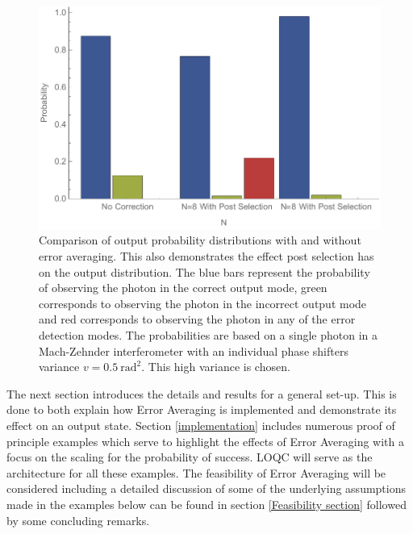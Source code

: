 \documentclass[aps,pra,twocolumn,superscriptaddress,numerical,floatfix]{revtex4-1}
\begin{document}
\begin{figure}
	\begin{centering}
		\includegraphics[width=\columnwidth]{prob_distributions.pdf}
	\end{centering}
	\caption[Comparison of output probability distributions with and without Error Averaging.]{Comparison of output probability distributions with and without error 	averaging. This also demonstrates the effect post selection has on the output distribution. The blue bars represent the probability of observing the photon in the correct output mode, green corresponds to observing the photon in the incorrect output mode and red corresponds to observing the photon in any of the error detection modes. The probabilities are based on a single photon in a Mach-Zehnder interferometer with an individual phase shifters variance $v=0.5\ \textrm{rad}^{2}$. This high variance is chosen.} 
	\label{fig:output_probabilities}
\end{figure}

The next section introduces the details and results for a general set-up. This is done to both explain how Error Averaging is implemented and demonstrate its effect on an output state. Section \ref{implementation} includes numerous proof of principle examples which serve to highlight the effects of Error Averaging with a focus on the scaling for the probability of success. LOQC will serve as the architecture for all these examples. The feasibility of Error Averaging will be considered including a detailed discussion of some of the underlying assumptions made in the examples below can be found in section \ref{Feasibility section} followed by some concluding remarks.

\end{document}
